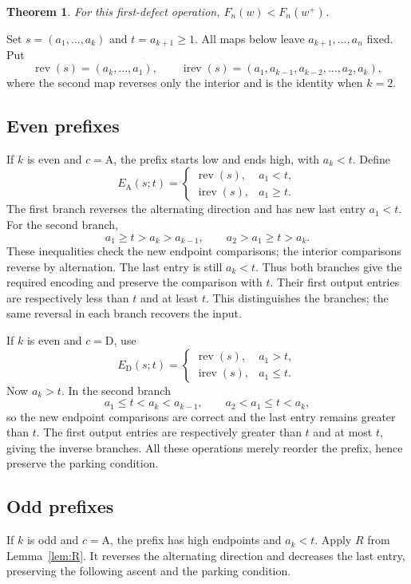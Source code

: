 \documentclass[11pt]{article}
\newtheorem{theorem}{Theorem}[section]
\theoremstyle{definition}
\newcommand{\rev}{\operatorname{rev}}
\newcommand{\irev}{\operatorname{irev}}
\newcommand{\A}{\mathrm A}
\newcommand{\D}{\mathrm D}
\begin{document}
\begin{theorem}\label{thm:first-defect}
For this first-defect operation, $F_n(w)<F_n(w^+)$.
\end{theorem}

Set $s=(a_1,\ldots,a_k)$ and $t=a_{k+1}\ge1$.
All maps below leave $a_{k+1},\ldots,a_n$ fixed. Put
\[
\rev(s)=(a_k,\ldots,a_1),\qquad
\irev(s)=(a_1,a_{k-1},a_{k-2},\ldots,a_2,a_k),
\]
where the second map reverses only the interior and is the identity
when $k=2$.

\subsection{Even prefixes}
If $k$ is even and $c=\A$, the prefix starts low and ends high,
with $a_k<t$. Define
\[
E_\A(s;t)=
\begin{cases}
\rev(s),&a_1<t,\\
\irev(s),&a_1\ge t.
\end{cases}
\]
The first branch reverses the alternating direction and has new last
entry $a_1<t$. For the second branch,
\[
a_1\ge t>a_k>a_{k-1},\qquad
a_2>a_1\ge t>a_k.
\]
These inequalities check the new endpoint comparisons; the interior
comparisons reverse by alternation. The last entry is still $a_k<t$.
Thus both branches give the required encoding and preserve the
comparison with $t$. Their first output entries are respectively
less than $t$ and at least $t$. This distinguishes the branches;
the same reversal in each branch recovers the input.

If $k$ is even and $c=\D$, use
\[
E_\D(s;t)=
\begin{cases}
\rev(s),&a_1>t,\\
\irev(s),&a_1\le t.
\end{cases}
\]
Now $a_k>t$. In the second branch
\[
a_1\le t<a_k<a_{k-1},\qquad
a_2<a_1\le t<a_k,
\]
so the new endpoint comparisons are correct and the last entry
remains greater than $t$. The first output entries are respectively
greater than $t$ and at most $t$, giving the inverse branches.
All these operations merely reorder the prefix, hence preserve
the parking condition.

\subsection{Odd prefixes}
If $k$ is odd and $c=\A$, the prefix has high endpoints and
$a_k<t$. Apply $R$ from Lemma~\ref{lem:R}. It reverses the
alternating direction and decreases the last entry, preserving
the following ascent and the parking condition.
\end{document}
